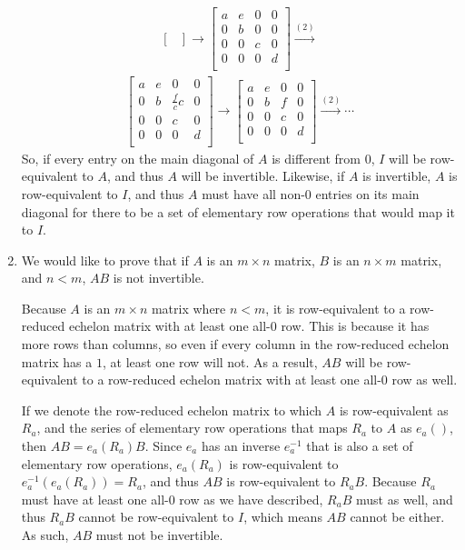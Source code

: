 \documentclass[12pt]{article}
\begin{document}
\begin{enumerate}
\begin{align*}
\begin{bmatrix}
      \end{bmatrix}
      \xrightarrow{}
      \begin{bmatrix}
        a & e & 0 & 0\\
        0 & b & 0 & 0\\
        0 & 0 & c & 0\\
        0 & 0 & 0 & d\\
      \end{bmatrix}
      \xrightarrow{(2)}
    \end{align*}
    \begin{align*}
      \begin{bmatrix}
        a & e & 0 & 0\\
        0 & b & \frac{f}{c}c & 0\\
        0 & 0 & c & 0\\
        0 & 0 & 0 & d\\
      \end{bmatrix}
      \xrightarrow{}
      \begin{bmatrix}
        a & e & 0 & 0\\
        0 & b & f & 0\\
        0 & 0 & c & 0\\
        0 & 0 & 0 & d\\
      \end{bmatrix}
      \xrightarrow{(2)}\cdots
    \end{align*}
    So, if every entry on the main diagonal of $A$ is different
    from $0$, $I$ will be row-equivalent to $A$, and thus $A$
    will be invertible. Likewise, if $A$ is invertible, $A$ is
    row-equivalent to $I$, and thus $A$ must have all non-$0$
    entries on its main diagonal for there to be a set of
    elementary row operations that would map it to $I$.

  \item
    We would like to prove that if $A$ is an $m \times n$ matrix,
    $B$ is an $n \times m$ matrix, and $n < m$, $AB$ is not
    invertible.

    Because $A$ is an $m \times n$ matrix where $n < m$, it is
    row-equivalent to a row-reduced echelon matrix with at least
    one all-$0$ row. This is because it has more rows than
    columns, so even if every column in the row-reduced echelon
    matrix has a $1$, at least one row will not. As a result,
    $AB$ will be row-equivalent to a row-reduced echelon matrix
    with at least one all-$0$ row as well.

    If we denote the row-reduced echelon matrix to which $A$ is
    row-equivalent as $R_a$, and the series of elementary row
    operations that maps $R_a$ to $A$ as $e_a()$, then $AB =
    e_a(R_a)B$. Since $e_a$ has an inverse $e_a^{-1}$ that is
    also a set of elementary row operations, $e_a(R_a)$ is
    row-equivalent to $e_a^{-1}(e_a(R_a)) = R_a$, and thus $AB$
    is row-equivalent to $R_aB$. Because $R_a$ must have at least
    one all-0 row as we have described, $R_aB$ must as well, and
    thus $R_aB$ cannot be row-equivalent to $I$, which means $AB$
    cannot be either. As such, $AB$ must not be invertible.


\end{enumerate}
\end{document}
